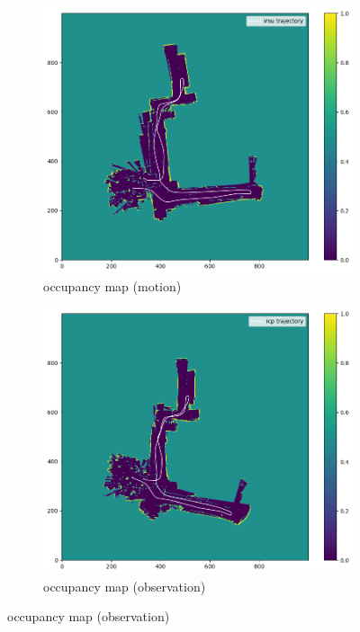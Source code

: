 \documentclass[conference]{IEEEtran}
\begin{document}
\begin{figure}
    \begin{subfigure}{0.24\textwidth}
        \includegraphics[width=\linewidth]{../img/omap_20_imu.png}
        \caption{occupancy map (motion)}
        \label{fig:omap_20_imu}
    \end{subfigure}
    \hfill
    \begin{subfigure}{0.24\textwidth}
        \includegraphics[width=\linewidth]{../img/omap_20_icp.png}
        \caption{occupancy map (observation)}

\end{subfigure}
\end{figure}
\end{document}
